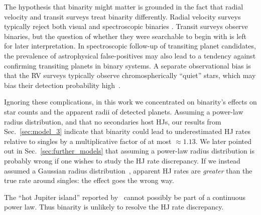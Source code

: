 \documentclass[12pt,modern]{aastex61}
\begin{document}
The hypothesis that binarity might matter is grounded in the fact that radial 
velocity and transit surveys treat binarity differently.
Radial velocity surveys typically reject both visual and spectroscopic binaries
\citep[\textit{e.g.},][]{wright_frequency_2012}.
Transit surveys observe binaries, but the question of whether they 
were searchable to begin with is left for later interpretation.
In spectroscopic follow-up of transiting planet candidates, the prevalence of 
astrophysical false-positives may also lead to a tendency against confirming 
transiting planets in binary systems.
A separate observational bias is that the RV surveys typically observe 
chromospherically ``quiet'' stars, which may bias their detection probability 
high~\citep{bastien_radial_2014}.

Ignoring these complications, in this work we concentrated on binarity's 
effects on star counts and the apparent radii of detected planets.
Assuming a power-law radius distribution, and that no secondaries host HJs,
our results from Sec.~\ref{sec:model_3} indicate that binarity 
could lead to underestimated HJ rates relative to singles by a multiplicative 
factor of at most $\approx 1.13$.
We later pointed out in Sec.~\ref{sec:further_models} that assuming a 
power-law radius distribution is probably wrong if one wishes to study the HJ 
rate discrepancy.
If we instead assumed a Gaussian radius 
distribution~\citep[following][]{petigura_CKS_2017}, apparent 
HJ rates are {\it greater} than the true rate around singles: the effect goes 
the wrong way.

The ``hot Jupiter island'' reported by~\citet{petigura_CKS_2017} cannot 
possibly be part of a continuous power law. 
Thus binarity is unlikely to resolve the HJ rate discrepancy.
\end{document}
